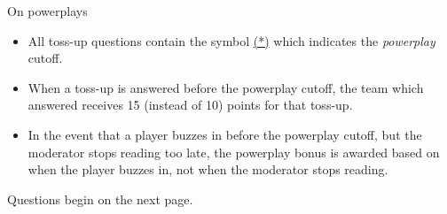 \documentclass{report}
\begin{document}
\vspace*{0.3 cm}
On powerplays
\begin{itemize}
    \item All toss-up questions contain the symbol \underline{(*)} which indicates the \textit{powerplay} cutoff.
    \item When a toss-up is answered before the powerplay cutoff, the team which answered receives 15 (instead of 10) points for that toss-up.
    \item In the event that a player buzzes in before the powerplay cutoff, but the moderator stops reading too late, the powerplay bonus is awarded based on when the player buzzes in, not when the moderator stops reading.
\end{itemize}

\newpage

\vspace*{\fill}
\centering
\thispagestyle{empty}
\Large
Questions begin on the next page.
\vspace*{\fill}

\normalsize
\newpage
\setcounter{page}{1}
\end{document}
